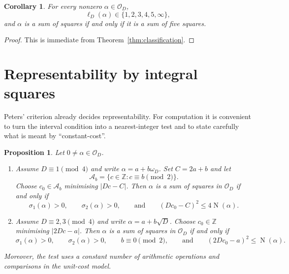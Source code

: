 \documentclass[manuscript,screen]{acmart}
\renewcommand{\le}{\leqslant}
\theoremstyle{plain}
\newtheorem{proposition}[theorem]{Proposition}
\newtheorem{corollary}[theorem]{Corollary}
\theoremstyle{definition}
\theoremstyle{nonitalicremark}
\newcommand{\Z}{\mathbb{Z}}
\newcommand{\OD}{\mathcal{O}_D}
\newcommand{\len}{\ell}
\newcommand{\wD}{\omega_D}
\newcommand{\sig}{\sigma}
\newcommand{\Norm}{\operatorname{N}}
\begin{document}
\begin{corollary}\label{cor:values}
For every nonzero $\alpha\in\OD$,
\[
\len_D(\alpha) \in \{1,2,3,4,5,\infty\},
\]
and $\alpha$ is a sum of squares if and only if it is a sum of five squares.
\end{corollary}

\begin{proof}
This is immediate from Theorem~\ref{thm:classification}.
\end{proof}

\section{Representability by integral squares}\label{sec:representability}

Peters' criterion already decides representability. For computation it is convenient to turn the
interval condition into a nearest-integer test and to state carefully what is meant by
``constant-cost''.

\begin{proposition}\label{prop:constant}
Let $0 \neq \alpha \in \OD$.
\begin{enumerate}[label=\textup{(\roman*)},itemsep=0.35em]
\item Assume $D\equiv 1 \pmod 4$ and write $\alpha = a+b\wD$.
Set $C = 2a+b$ and let
\[
\mathcal A_b = \{c\in\Z : c\equiv b \pmod 2\}.
\]
Choose $c_0 \in \mathcal A_b$ minimising $|Dc-C|$.
Then $\alpha$ is a sum of squares in $\OD$ if and only if
\[
\sig_1(\alpha)>0,\qquad \sig_2(\alpha)>0,
\qquad\text{and}\qquad
(Dc_0-C)^2 \le 4\Norm(\alpha).
\]

\item Assume $D\equiv 2,3 \pmod 4$ and write $\alpha = a+b\sqrt D$.
Choose $c_0\in\Z$ minimising $|2Dc-a|$.
Then $\alpha$ is a sum of squares in $\OD$ if and only if
\[
\sig_1(\alpha)>0,\qquad \sig_2(\alpha)>0,\qquad b\equiv 0 \pmod 2,
\qquad\text{and}\qquad (2Dc_0-a)^2 \le \Norm(\alpha).
\]
\end{enumerate}
Moreover, the test uses a constant number of arithmetic operations and comparisons in the
unit-cost model.
\end{proposition}
\end{document}

